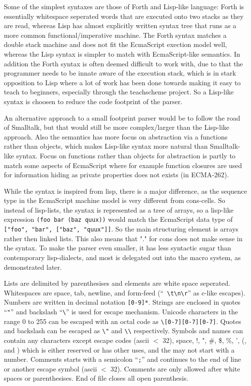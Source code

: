 Some of the simplest syntaxes are those of Forth and Lisp-like language: Forth is essentially whitespace seperated words that are executed onto two stacks as they are read, whereas Lisp has almost explicitly written syntax tree that runs as a more common functional/imperative machine.
The Forth syntax matches a double stack machine and does not fit the EcmaScript exection model well, whereas the Lisp syntax is simpler to match with EcmaScript-like semantics. 
In addition the Forth syntax is often deemed difficult to work with, due to that the programmer needs to be innate aware of the execution stack, which is in stark opposition to Lisp where a lot of work has been done towards making it easy to teach to beginners, especially through the teachscheme project\cite{teachscheme}.
So a Lisp-like syntax is choosen to reduce the code footprint of the parser.

An alternative approach to a small footprint parser would be to follow the road of Smalltalk,
but that would still be more complex/larger than the Lisp-like approach.
Also the semantics has more focus on abstraction via a functions rather than objects, which makes Lisp-like syntax more natural than Smalltalk-like syntax. 
Focus on functions rather than objects for abstraction is partly to match some aspects of EcmaScript where for example function closures are used for information hiding as private properties does not exists (in ECMA-262)\cite{javascriptoop}. 

While the syntax is inspired from lisp,
there is a major difference, as the sequence type
in the EcmaScript machine model is very different from cons-cells.
So instead of lisp-lists, the syntax is represented
as a tree of arrays, so a lisp-like expression
\verb|(foo bar (baz quux))|
would match the EcmaScript data type of \verb|["foo", "bar", ["baz", "quux"]]|.
So the main structuring element is arrays rather then linked lists.
This also means that "." for cons does not make sense in the syntax.
To make the parser even smaller, it has less syntactic sugar than contemporary lisp-dialects, and most is delegated out into the macro system, as demonstrated later.

Lists are delimited by parenthesises and elements are white space seperated.
Whitespaces are space, tab, newline, and form-feed (``\verb| \t\n\r|'' as c-like escapes).
Numbers are written in decimal notation \verb|[0-9]*|.
Strings are enclosed in quotes ``\verb|"|'' and backslash ``\verb|\|'' is used for escape mechanism. Unicode characters in the range 0 to 255 can be escaped with an octal code as \verb|\[0-7][0-7][0-7]|. Quotes and backslash can be escaped as \verb|\"| and \verb|\\| respectively. 
Symbols and names can contain any characters except escape codes (ascii $<$ 32), space, !, ", \#, \$, \%, ', (, and ) which is either reserved or has other uses, and the may not start with a number. 
Comments starts with a semicolon ``\verb|;|'' and continues to the end of line or another escape symbol (ascii $<$ 32). Comments are only allowed after white spaces or parenthesises.
End of file closes all open parenthesis.

